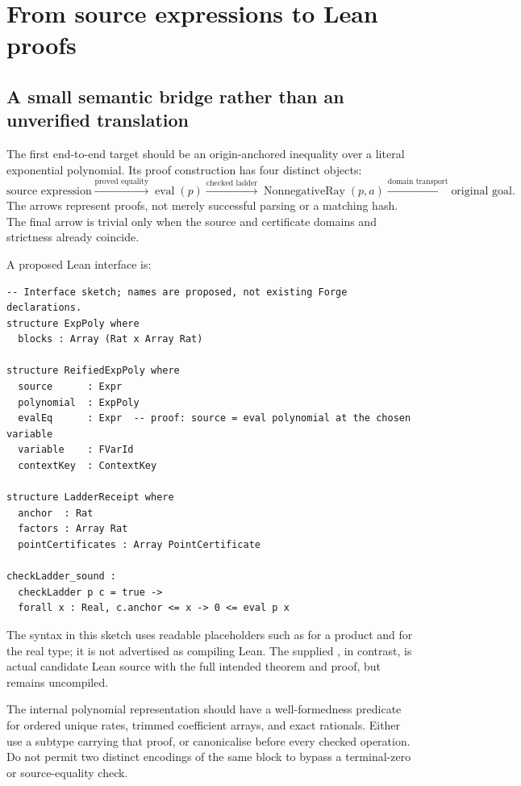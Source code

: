 \section{From source expressions to Lean proofs}
\label{sec:lean}

\subsection{A small semantic bridge rather than an unverified translation}

The first end-to-end target should be an origin-anchored inequality over a
literal exponential polynomial. Its proof construction has four distinct
objects:
\[
 \text{source expression}
 \xrightarrow{\text{proved equality}}
 \operatorname{eval}(p)
 \xrightarrow{\text{checked ladder}}
 \operatorname{NonnegativeRay}(p,a)
 \xrightarrow{\text{domain transport}}
 \text{original goal}.
\]
The arrows represent proofs, not merely successful parsing or a matching hash.
The final arrow is trivial only when the source and certificate domains and
strictness already coincide.

A proposed Lean interface is:
\par\noindent\begin{minipage}{\linewidth}
\begin{lstlisting}
-- Interface sketch; names are proposed, not existing Forge declarations.
structure ExpPoly where
  blocks : Array (Rat x Array Rat)

structure ReifiedExpPoly where
  source      : Expr
  polynomial  : ExpPoly
  evalEq      : Expr  -- proof: source = eval polynomial at the chosen variable
  variable    : FVarId
  contextKey  : ContextKey

structure LadderReceipt where
  anchor  : Rat
  factors : Array Rat
  pointCertificates : Array PointCertificate

checkLadder_sound :
  checkLadder p c = true ->
  forall x : Real, c.anchor <= x -> 0 <= eval p x
\end{lstlisting}
\end{minipage}\par

The syntax in this sketch uses readable placeholders such as  for a
product and  for the real type; it is not advertised as compiling
Lean. The supplied , in contrast, is actual candidate
Lean source with the full intended theorem and proof, but remains uncompiled.

The internal polynomial representation should have a well-formedness predicate
for ordered unique rates, trimmed coefficient arrays, and exact rationals.
Either use a subtype carrying that proof, or canonicalise before every checked
operation. Do not permit two distinct encodings of the same block to bypass a
terminal-zero or source-equality check.


